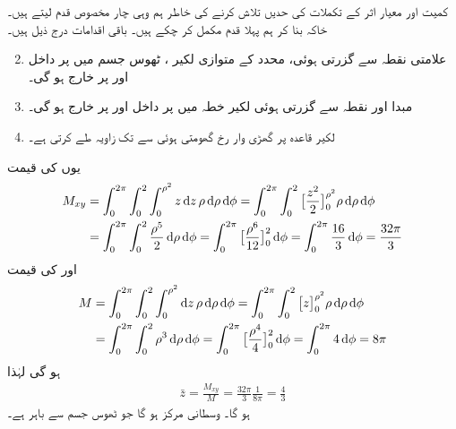 کمیت اور معیار اثر کے تکملات کی حدیں تلاش کرنے کی خاطر  ہم وہی چار مخصوص قدم لیتے ہیں۔  خاکہ بنا  کر ہم پہلا قدم مکمل کر چکے ہیں۔ باقی اقدامات   درج ذیل  ہیں۔
\begin{enumerate}
 \setcounter{enumi}{1}
\item
{}\quad
علامتی نقطہ  سے گزرتی ہوئی، محدد  کے متوازی  لکیر ،  ٹھوس جسم میں   پر   داخل اور   پر خارج ہو گی۔ 
\item
{}\quad
مبدا  اور  نقطہ  سے گزرتی ہوئی لکیر  خطہ  میں  پر  داخل اور  پر خارج ہو گی۔
\item
{}\quad
لکیر  قاعدہ پر گھڑی وار رخ  گھومتی  ہوئی     سے   تک  زاویہ طے کرتی ہے۔
\end{enumerate}
یوں  کی قیمت
\begin{align*} 
 M_{xy}&=\int_0^{2\pi}\int_0^{2}\int_0^{\rho^2}z\dif z \,\rho\dif \rho\dif \phi =\int_0^{2\pi}\int_0^2\big[\frac{z^2}{2}\big]_{0}^{\rho^2} \rho\dif \rho\dif \phi\\
&=\int_0^{2\pi}\int_0^2\frac{\rho^5}{2}\dif \rho\dif \phi=\int_0^{2\pi}\big[\frac{\rho^6}{12}\big]_0^{2}\dif \phi=\int_0^{2\pi}\frac{16}{3}\dif\phi=\frac{32\pi}{3}
\end{align*}
اور  کی قیمت
\begin{align*}
M&=\int_0^{2\pi}\int_0^2\int_0^{\rho^2}\dif z \,\rho\dif \rho\dif \phi=\int_0^{2\pi}\int_0^2\big[z\big]_{0}^{\rho^2} \rho\dif \rho\dif \phi\\
&=\int_0^{2\pi}\int_0^2 \rho^3\dif \rho\dif \phi=\int_0^{2\pi}\big[\frac{\rho^4}{4}\big]_0^2\dif\phi=\int_0^{2\pi}4\dif\phi=8\pi
\end{align*}
ہو گی لہٰذا
\begin {align*}
\bar {z}=\frac  {M_{xy}} {M}=\frac{32\pi}{3}\frac{1}{8\pi}=\frac{4}{3}
\end {align*}
ہو گا۔ وسطانی مرکز  ہو گا جو  ٹھوس جسم سے باہر ہے۔

